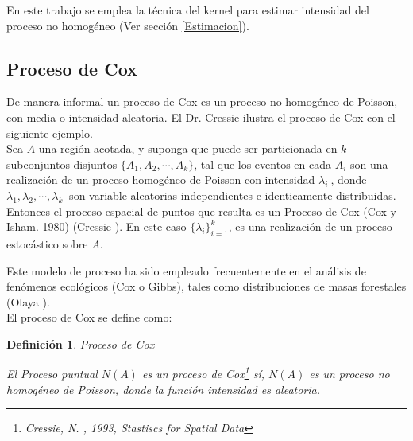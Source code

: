 \documentclass[12pt]{report}
\newtheorem{defi}{{\bf Definición}}[chapter]
\begin{document}
	En este trabajo se emplea la técnica  del kernel  para estimar intensidad del proceso no homogéneo (Ver sección \ref{Estimacion}). 
		
			
			
			\subsection{Proceso de Cox}{ \label{Cox1} } 
			
			De manera informal un proceso de Cox es un proceso no homogéneo de Poisson, con media o intensidad  aleatoria. El Dr. Cressie ilustra el  proceso de Cox con el siguiente ejemplo.\\
			
			Sea $A$ una región acotada, y suponga que puede ser particionada en $k$ subconjuntos disjuntos $ \{ A_{1}, A_{2}, \cdots,  A_{k} \} $,  tal que los eventos en cada $ A_{i} $ son una realización de un proceso homogéneo de Poisson con intensidad $ \lambda_{i} \: $,  donde $ \lambda_{1}, \lambda_{2},\cdots, \lambda_{k} \: $ son variable aleatorias independientes e identicamente distribuidas. Entonces el proceso espacial de puntos que resulta es un Proceso de  Cox (Cox y Isham. 1980) (Cressie \cite{Cress}). En este caso $ \{ \lambda_{i}  \}^{k}_{i=1}$, es una realización de un proceso estocástico  sobre $A$.			
			
			Este modelo de proceso ha sido empleado frecuentemente en el análisis de fenómenos ecológicos (Cox o Gibbs), tales como  distribuciones  de masas forestales (Olaya \cite{Olaya}).\\
						
			
			El proceso de Cox se define como:
			
			\begin{defi}{Proceso de Cox}{ \label{Cox2} }
				
				El Proceso  puntual $N(A)$ es un proceso de Cox{\footnote{Cressie, N. , 1993, Stastiscs for Spatial Data}} sí, $N(A)$ es un proceso no homogéneo de Poisson, donde  la función intensidad es aleatoria.
				
			\end{defi} 
			
\end{document}
